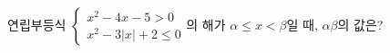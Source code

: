 연립부등식 $\begin{cases} x^2-4x-5>0 \\ x^2-3|x|+2\le 0 \end{cases}$의 해가 $\alpha\le x<\beta$일 때, $\alpha\beta$의 값은?
